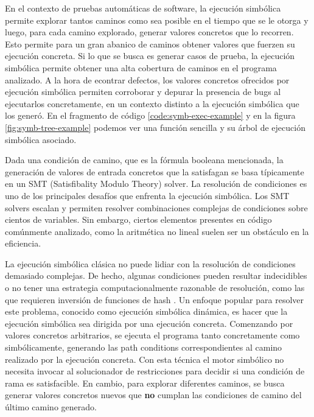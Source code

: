 En el contexto de pruebas automáticas de software, la ejecución simbólica permite explorar tantos caminos como sea posible en el tiempo que se le otorga y luego, para cada camino explorado, generar valores concretos que lo recorren.
Esto permite para un gran abanico de caminos obtener valores que fuerzen su ejecución concreta.
Si lo que se busca es generar casos de prueba, la ejecución simbólica permite obtener una alta cobertura de caminos en el programa analizado.
A la hora de econtrar defectos, los valores concretos ofrecidos por ejecución simbólica permiten corroborar y depurar la presencia de bugs al ejecutarlos concretamente, en un contexto distinto a la ejecución simbólica que los generó.
En el fragmento de código \ref{code:symb-exec-example} y en la figura \ref{fig:symb-tree-example} podemos ver una función sencilla y su árbol de ejecución simbólica asociado.

Dada una condición de camino, que es la fórmula booleana mencionada, la generación de valores de entrada concretos que la satisfagan se basa típicamente en un SMT (Satisfibality Modulo Theory) solver.
La resolución de condiciones es uno de los principales desafíos que enfrenta la ejecución simbólica.
Los SMT solvers escalan y permiten resolver combinaciones complejas de condiciones sobre cientos de variables.
Sin embargo, ciertos elementos presentes en código comúnmente analizado, como la aritmética no lineal suelen ser un obstáculo en la eficiencia.

La ejecución simbólica clásica no puede lidiar con la resolución de condiciones demasiado complejas.
De hecho, algunas condiciones pueden resultar indecidibles o no tener una estrategia computacionalmente razonable de resolución, como las que requieren inversión de funciones de hash \cite{manticore}.
Un enfoque popular para resolver este problema, conocido como ejecución simbólica dinámica, es hacer que la ejecución simbólica sea dirigida por una ejecución concreta.
Comenzando por valores concretos arbitrarios, se ejecuta el programa tanto concretamente como simbólicamente, generando las path conditions correspondientes al camino realizado por la ejecución concreta.
Con esta técnica el motor simbólico no necesita invocar al solucionador de restricciones para decidir si una condición de rama es satisfacible.
En cambio, para explorar diferentes caminos, se busca generar valores concretos nuevos que \textbf{no} cumplan las condiciones de camino del último camino generado.

